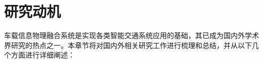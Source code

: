 \section[\hspace{-2pt}研究动机]{{ \hspace{-8pt}研究动机}}\label{section 1-3}

车载信息物理融合系统是实现各类智能交通系统应用的基础，其已成为国内外学术界研究的热点之一。本章节将对国内外相关研究工作进行梳理和总结，并从以下几个方面进行详细阐述：



